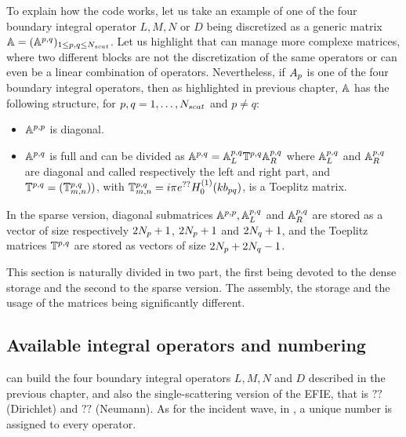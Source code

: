 To explain how the code works, let us take an example of one of the four boundary integral operator $L,M,N$ or $D$ being discretized as a generic matrix ${\mathbb{A}} = (\mathbb{A}^{p,q})_{1\leq p,q\leq N_{scat}}$. Let us highlight that \mudiff can manage more complexe matrices, where two different blocks are not the discretization of the same operators or can even be a linear combination of operators. Nevertheless, if $A_{p}$ is one of the four boundary integral operators, then as highlighted in previous chapter, ${\mathbb{A}}$ has the following structure, for $p,q=1,\ldots,N_{scat}$ and $p\neq q$:
\begin{itemize}
\item $\mathbb{A}^{p,p}$ is diagonal.
\item $\mathbb{A}^{p,q}$ is full and can be divided as $\mathbb{A}^{p,q} = {\mathbb{A}}_L^{p,q}\mathbb{T}^{p,q}{\mathbb{A}}_R^{p,q}$ where ${\mathbb{A}}_L^{p,q}$ and ${\mathbb{A}}_R^{p,q}$ are diagonal and called respectively the left and right part, and $\mathbb{T}^{p,q} = (\mathbb{T}^{p,q}_{m,n}))$, with $\mathbb{T}^{p,q}_{m,n} = i\pi e^{??}H_0^{(1)}(kb_{pq})$, is a Toeplitz matrix.
\end{itemize}
In the sparse version, diagonal submatrices $\mathbb{A}^{p,p},{\mathbb{A}}_L^{p,q}$ and ${\mathbb{A}}_R^{p,q}$  are stored as a vector of size respectively $2N_{p}+1$, $2N_{p}+1$ and $2N_{q}+1$, and the Toeplitz matrices $\mathbb{T}^{p,q}$ are stored as vectors of size $2N_{p}+2N_{q}-1$.

This section is naturally divided in two part, the first being devoted to the dense storage and the second to the sparse version. The assembly, the storage and the usage of the matrices being significantly different.

\subsection{Available integral operators and numbering}
\label{seccode:IntOp}

\mudiff can build the four boundary integral operators $L,M,N$ and $D$ described in the previous chapter, and also the single-scattering version of the EFIE, that is $??$ (Dirichlet) and $??$ (Neumann). As for the incident wave, in \mudiff, a unique number is assigned to every operator.

